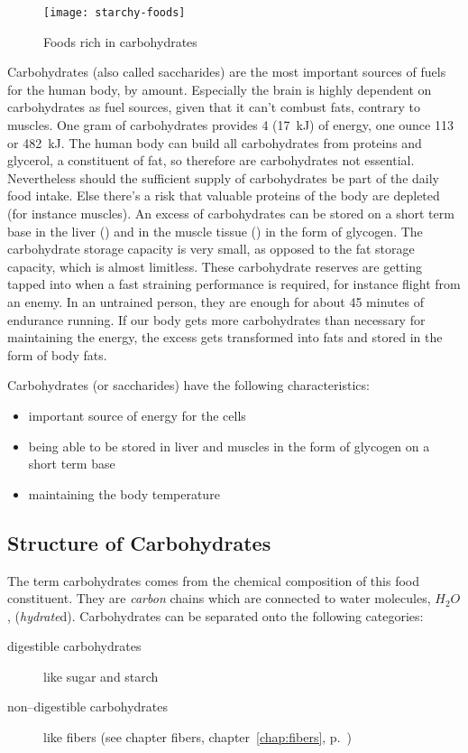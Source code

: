 \documentclass[../main.tex]{subfiles}
\begin{document}
\begin{figure}[htb!]
\centering
  \texttt{[image: starchy-foods]}
  \caption{Foods rich in carbohydrates~\cite{PicCarbohydrates}}
\end{figure}


Carbohydrates (also called saccharides) are the most important sources of fuels for the human body, by amount.
Especially the brain is highly dependent on carbohydrates as fuel sources, given that it can't combust fats, contrary to muscles.
One gram of carbohydrates provides \SI{4}{\kcal} (\SI{17}{\kJ}) of energy, one ounce \SI{113}{\kcal} or \SI{482}{kJ}.
The human body can build all carbohydrates from proteins and glycerol, a constituent of fat, so therefore are carbohydrates not essential.
Nevertheless should the sufficient supply of carbohydrates be part of the daily food intake.
Else there's a risk that valuable proteins of the body are depleted (for instance muscles).
An excess of carbohydrates can be stored on a short term base in the liver () and in the muscle tissue () in the form of glycogen.
The carbohydrate storage capacity is very small, as opposed to the fat storage capacity, which is almost limitless.
These carbohydrate reserves are getting tapped into when a fast straining performance is required, for instance flight from an enemy.
In an untrained person, they are enough for about 45 minutes of endurance running.
If our body gets more carbohydrates than necessary for maintaining the energy, the excess gets transformed into fats and stored in the form of body fats.

Carbohydrates (or saccharides) have the following characteristics:
\begin{itemize}
\item important source of energy for the cells
\item being able to be stored in liver and muscles in the form of glycogen on a short term base
\item maintaining the body temperature
\end{itemize}

\subsection{Structure of Carbohydrates}

The term carbohydrates comes from the chemical composition of this food constituent.
They are \emph{carbon} chains which are connected to water molecules, $H_2O$, (\emph{hydrate}d).
Carbohydrates can be separated onto the following categories:
\begin{description}
\item[digestible carbohydrates] like sugar and starch
\item[non--digestible carbohydrates] like fibers (see chapter fibers, chapter~\ref{chap:fibers}, p.~\pageref{chap:fibers})
\end{description}
\end{document}

